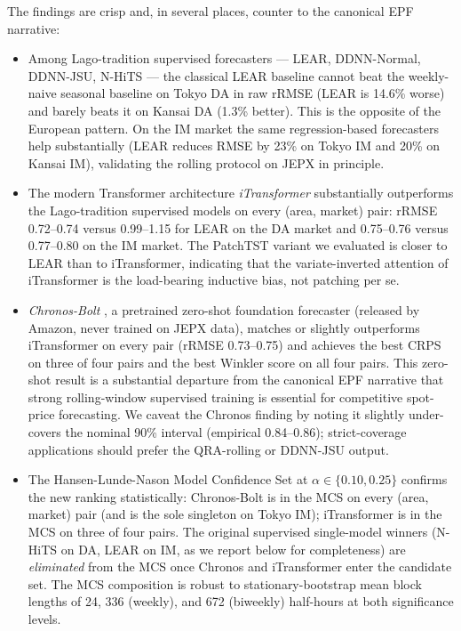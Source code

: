 \documentclass[review,3p,times,authoryear]{elsarticle}
\begin{document}
The findings are crisp and, in several places, counter to the canonical EPF narrative:
\begin{itemize}\itemsep0pt
\item Among Lago-tradition supervised forecasters --- LEAR, DDNN-Normal, DDNN-JSU, N-HiTS --- the classical LEAR baseline cannot beat the weekly-naive seasonal baseline on Tokyo DA in raw rRMSE (LEAR is 14.6\% worse) and barely beats it on Kansai DA (1.3\% better). This is the opposite of the European pattern. On the IM market the same regression-based forecasters help substantially (LEAR reduces RMSE by 23\% on Tokyo IM and 20\% on Kansai IM), validating the rolling protocol on JEPX in principle.
\item The modern Transformer architecture \emph{iTransformer} \citep{liu2024itransformer} substantially outperforms the Lago-tradition supervised models on every (area, market) pair: rRMSE 0.72--0.74 versus 0.99--1.15 for LEAR on the DA market and 0.75--0.76 versus 0.77--0.80 on the IM market. The PatchTST \citep{nie2023patchtst} variant we evaluated is closer to LEAR than to iTransformer, indicating that the variate-inverted attention of iTransformer is the load-bearing inductive bias, not patching per se.
\item \emph{Chronos-Bolt} \citep{ansari2024chronos}, a pretrained zero-shot foundation forecaster (released by Amazon, never trained on JEPX data), matches or slightly outperforms iTransformer on every pair (rRMSE 0.73--0.75) and achieves the best CRPS on three of four pairs and the best Winkler score on all four pairs. This zero-shot result is a substantial departure from the canonical EPF narrative that strong rolling-window supervised training is essential for competitive spot-price forecasting. We caveat the Chronos finding by noting it slightly under-covers the nominal 90\% interval (empirical 0.84--0.86); strict-coverage applications should prefer the QRA-rolling or DDNN-JSU output.
\item The Hansen-Lunde-Nason Model Confidence Set at \(\alpha\in\{0.10, 0.25\}\) confirms the new ranking statistically: Chronos-Bolt is in the MCS on every (area, market) pair (and is the sole singleton on Tokyo IM); iTransformer is in the MCS on three of four pairs. The original supervised single-model winners (N-HiTS on DA, LEAR on IM, as we report below for completeness) are \emph{eliminated} from the MCS once Chronos and iTransformer enter the candidate set. The MCS composition is robust to stationary-bootstrap mean block lengths of 24, 336 (weekly), and 672 (biweekly) half-hours at both significance levels.

\end{itemize}
\end{document}
